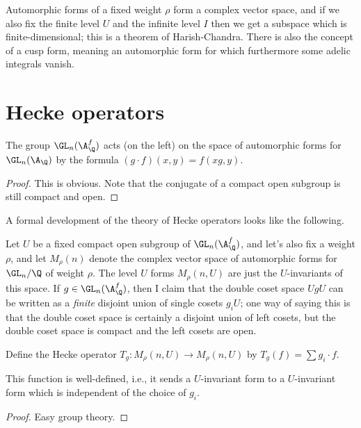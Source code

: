 Automorphic forms of a fixed weight $\rho$ form a complex vector space, and if we also
fix the finite level $U$ and the infinite level $I$ then we get a subspace which is
finite-dimensional; this is a theorem of Harish-Chandra. There is also the concept
of a cusp form, meaning an automorphic form for which furthermore some adelic integrals
vanish.

\section{Hecke operators}

\begin{lemma} 
  \label{test}
  The group $\GL_n(\A_{\Q}^f)$ acts (on the left) on the space of automorphic forms
  for $\GL_n(\A_{\Q})$ by the formula $(g\cdot f)(x,y)=f(xg,y)$.
\end{lemma}
\begin{proof}
  This is obvious. Note that the conjugate of a compact open subgroup is still
  compact and open.
\end{proof}

A formal development of the theory of Hecke operators looks like the following.

Let $U$ be a fixed compact open subgroup of $\GL_n(\A_{\Q}^f)$, and let's also fix
a weight $\rho$, and let $M_\rho(n)$ denote the complex vector space of automorphic
forms for $\GL_n/\Q$ of weight $\rho$. The level $U$ forms $M_\rho(n,U)$ are just the $U$-invariants
of this space. If $g\in\GL_n(\A_{\Q}^f)$, then I
claim that the double coset space $UgU$ can be written as a \emph{finite} disjoint union
of single cosets $g_iU$; one way of saying this is that the double coset space is certainly
a disjoint union of left cosets, but the double coset space is compact and the left cosets
are open.

Define the Hecke operator $T_g:M_\rho(n,U)\to M_\rho(n,U)$ by
$T_g(f)=\sum g_i\cdot f$.

\begin{lemma} This function is well-defined, i.e., it sends a $U$-invariant form to
  a $U$-invariant form which is independent of the choice of $g_i$.
\end{lemma}
\begin{proof} Easy group theory.
\end{proof}
